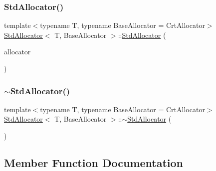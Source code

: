 \subsubsection{\texorpdfstring{Std\+Allocator()}{StdAllocator()}\hspace{0.1cm}{\footnotesize\ttfamily [4/4]}}
{\footnotesize\ttfamily template$<$typename T, typename Base\+Allocator = Crt\+Allocator$>$ \\
\hyperlink{classStdAllocator}{Std\+Allocator}$<$ T, Base\+Allocator $>$\+::\hyperlink{classStdAllocator}{Std\+Allocator} (\begin{DoxyParamCaption}\item[{const Base\+Allocator \&}]{allocator }\end{DoxyParamCaption})\hspace{0.3cm}{\ttfamily [inline]}}

\mbox{\label{classStdAllocator_a3d1703f93d5929c71a35e0c9baf9ceb1}} 
\subsubsection{\texorpdfstring{$\sim$\+Std\+Allocator()}{~StdAllocator()}}
{\footnotesize\ttfamily template$<$typename T, typename Base\+Allocator = Crt\+Allocator$>$ \\
\hyperlink{classStdAllocator}{Std\+Allocator}$<$ T, Base\+Allocator $>$\+::$\sim$\hyperlink{classStdAllocator}{Std\+Allocator} (\begin{DoxyParamCaption}{ }\end{DoxyParamCaption})\hspace{0.3cm}{\ttfamily [inline]}}



\subsection{Member Function Documentation}
\mbox{\label{classStdAllocator_afbe805c057283166350a93f6c7e7a2c6}} 
